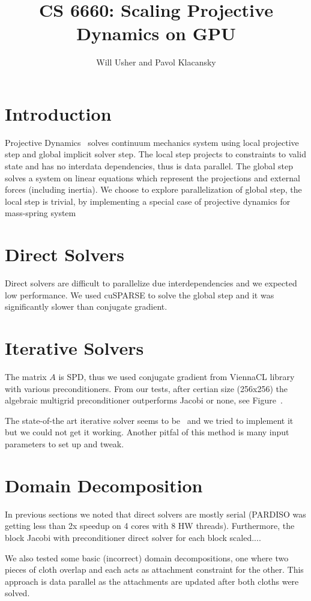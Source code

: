 \documentclass{article}
\title{CS 6660: Scaling Projective Dynamics on GPU}
\author{Will Usher and Pavol Klacansky}
\begin{document}
\maketitle

\section{Introduction}
Projective Dynamics~\cite{Bouaziz14} solves continuum mechanics system using
local projective step and global implicit solver step. The local step projects
to constraints to valid state and has no interdata dependencies, thus is data
parallel. The global step solves a system on linear equations which represent
the projections and external forces (including inertia). We choose to explore
parallelization of global step, the local step is trivial, by implementing
a special case of projective dynamics for mass-spring system~\cite{Liu13}


\section{Direct Solvers}
Direct solvers are difficult to parallelize due interdependencies and we
expected low performance. We used cuSPARSE to solve the global step and it
was significantly slower than conjugate gradient.


\section{Iterative Solvers}
The matrix $A$ is SPD, thus we used conjugate gradient from ViennaCL library
with various preconditioners. From our tests, after certian size (256x256)
the algebraic multigrid preconditioner outperforms Jacobi or none,
see Figure~.

The state-of-the art iterative solver seems to be~\cite{Wang15} and we tried
to implement it but we could not get it working. Another pitfal of this method
is many input parameters to set up and tweak.


\section{Domain Decomposition}
In previous sections we noted that direct solvers are mostly serial (PARDISO
was getting less than 2x speedup on 4 cores with 8 HW threads). Furthermore,
the block Jacobi with preconditioner direct solver for each block scaled....

We also tested some basic (incorrect) domain decompositions, one where two
pieces of cloth overlap and each acts as attachment constraint for the other.
This approach is data parallel as the attachments are updated after both
cloths were solved.
\end{document}
